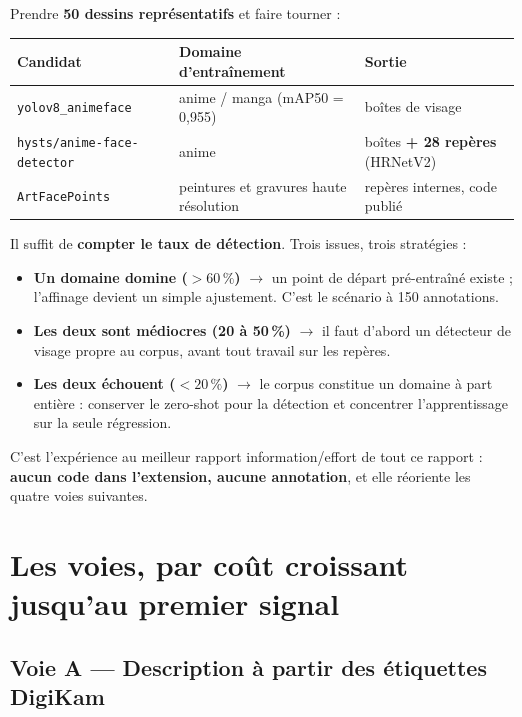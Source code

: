 \documentclass[11pt,a4paper]{article}
\newcommand{\aretenir}[1]{%
  \par\medskip
  \noindent\colorbox{encadre}{%
    \begin{minipage}{\dimexpr\linewidth-2\fboxsep}
      \vspace{2pt}#1\vspace{2pt}
    \end{minipage}}%
  \par\medskip
}
\begin{document}
Prendre \textbf{50 dessins représentatifs} et faire tourner :

\begin{table}[h]
\centering
\small
\begin{tabularx}{\textwidth}{lYY}
\toprule
\textbf{Candidat} & \textbf{Domaine d'entraînement} & \textbf{Sortie} \\
\midrule
\texttt{yolov8\_animeface}      & anime / manga (mAP50 = 0,955) & boîtes de visage \\
\texttt{hysts/anime-face-detector} & anime & boîtes \textbf{+ 28 repères} (HRNetV2) \\
\texttt{ArtFacePoints}          & peintures et gravures haute résolution & repères internes, code publié \\
\bottomrule
\end{tabularx}
\end{table}

Il suffit de \textbf{compter le taux de détection}. Trois issues, trois
stratégies :

\begin{itemize}[leftmargin=*,itemsep=4pt]
  \item \textbf{Un domaine domine ($>60\,\%$)} $\rightarrow$ un point de départ
  pré-entraîné existe ; l'affinage devient un simple ajustement. C'est le
  scénario à 150 annotations.
  \item \textbf{Les deux sont médiocres (20 à 50\,\%)} $\rightarrow$ il faut
  d'abord un détecteur de visage propre au corpus, avant tout travail sur les
  repères.
  \item \textbf{Les deux échouent ($<20\,\%$)} $\rightarrow$ le corpus constitue
  un domaine à part entière : conserver le zero-shot pour la détection et
  concentrer l'apprentissage sur la seule régression.
\end{itemize}

\aretenir{C'est l'expérience au meilleur rapport information/effort de tout ce
rapport : \textbf{aucun code dans l'extension, aucune annotation}, et elle
réoriente les quatre voies suivantes.}

\section{Les voies, par coût croissant jusqu'au premier signal}
\label{sec:voies}

\subsection{Voie A — Description à partir des étiquettes DigiKam}
\end{document}
